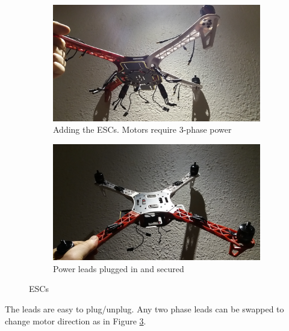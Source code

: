 \begin{figure}[H]
\begin{subfigure}{0.5\textwidth}
\centering
\includegraphics[scale=0.1]{images/drone-build-esc-3phaseunconnected.jpg}
\caption{Adding the ESCs. Motors require 3-phase power}
\label{fig:ESCs_uplugged}
\end{subfigure}
\begin{subfigure}{0.5\textwidth}
\centering
\includegraphics[scale=0.1]{images/drone-build-esc-3phaseconnected.jpg}
\caption{Power leads plugged in and secured}
\label{fig:ESCs_plugged}
\end{subfigure}
\caption{ESCs}
\label{fig:ESC}
\end{figure}

\noindent
The leads are easy to plug/unplug. Any two phase leads can be swapped to change motor direction as in Figure \ref{fig:ESC}.\\

